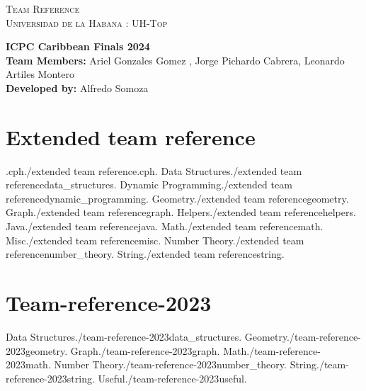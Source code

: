 \documentclass[letter]{amsart}
\begin{document}
  \thispagestyle{fancy}
  \begin{center}
    \Huge\textsc{Team Reference \\ Universidad de la Habana : UH-Top }
  \end{center}
  
  \begin{center}
    \textbf{ ICPC Caribbean Finals 2024 }\\
    \textbf{Team Members:} Ariel Gonzales Gomez , Jorge Pichardo Cabrera, Leonardo Artiles Montero\\
    \textbf{Developed by:} Alfredo Somoza
  \end{center}  

  \begin{multicols}{2}
    \tableofcontents
  \end{multicols}

  

  \enlargethispage*{\baselineskip}
  \pagebreak

  \section{ Extended team reference }
      {.cph}{./extended team reference}{.cph.}
      {Data Structures}{./extended team reference}{data_structures.}
      {Dynamic Programming}{./extended team reference}{dynamic_programming.}
      {Geometry}{./extended team reference}{geometry.}
      {Graph}{./extended team reference}{graph.}
      {Helpers}{./extended team reference}{helpers.}
      {Java}{./extended team reference}{java.}
      {Math}{./extended team reference}{math.}
      {Misc}{./extended team reference}{misc.}
      {Number Theory}{./extended team reference}{number_theory.}
      {String}{./extended team reference}{string.}
    
  

  \enlargethispage*{\baselineskip}
  \pagebreak

  \section{ Team-reference-2023 }
      {Data Structures}{./team-reference-2023}{data_structures.}
      {Geometry}{./team-reference-2023}{geometry.}
      {Graph}{./team-reference-2023}{graph.}
      {Math}{./team-reference-2023}{math.}
      {Number Theory}{./team-reference-2023}{number_theory.}
      {String}{./team-reference-2023}{string.}
      {Useful}{./team-reference-2023}{useful.}
    
  
\end{document}
